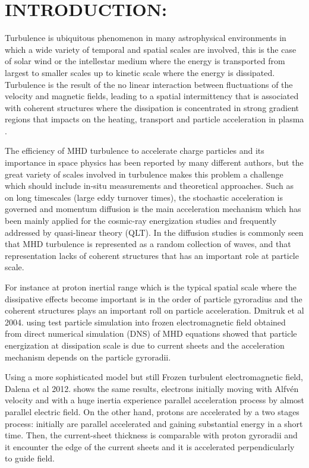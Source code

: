 \documentclass[%
aip,pop,amsmath,amssymb,
 reprint,%
]{revtex4-1}
\begin{document}
\section{\label{sec:level1}INTRODUCTION:}
Turbulence is ubiquitous phenomenon in many astrophysical environments in which a wide  
variety of temporal and spatial scales are involved, this is the case of solar wind or the 
intellestar medium where the energy is transported from largest to smaller scales up to 
kinetic scale where the energy is dissipated. Turbulence is the result of the  no linear 
interaction between fluctuations of the velocity and magnetic fields, leading to a 
spatial intermittency that is associated with coherent structures where the dissipation is 
concentrated in strong gradient regions that impacts on the heating, transport and particle 
acceleration in plasma \cite{M1}.

The efficiency of MHD turbulence to accelerate charge particles and its importance in space 
physics has been reported by many different authors\cite{F1,L1,M2}, but the great variety of 
scales involved in turbulence makes this problem a challenge which should include in-situ 
measurements and theoretical approaches. Such as on long timescales (large eddy turnover times),
the stochastic acceleration is governed and momentum diffusion is the main acceleration 
mechanism which has been mainly applied for the cosmic-ray energization studies and frequently
addressed by quasi-linear theory (QLT)\cite{S1,CH1,Lange1}. In the diffusion studies is 
commonly seen that MHD turbulence is represented as a random collection of waves, and that 
representation lacks of coherent structures that has an important role at particle scale.

For instance at proton inertial range which is the typical spatial scale where the 
dissipative effects become important is in the order of particle gyroradius and the coherent 
structures plays an important roll on particle acceleration. Dmitruk et al 2004.\cite{PD1}  
using test particle simulation into frozen electromagnetic field obtained from direct 
numerical simulation (DNS) of MHD equations showed that particle energization at dissipation
scale is due to current sheets and the acceleration mechanism depends on the particle 
gyroradii. 

Using a more sophisticated model but still Frozen turbulent electromagnetic field, Dalena et 
al 2012.\cite{Dalena2012} shows the same results, electrons initially moving with 
Alfv\'en velocity and with a huge inertia experience parallel acceleration process by almost 
parallel electric field. On the other hand, protons are accelerated by a two stages process: 
initially are parallel accelerated and gaining substantial energy in a short time. Then, the 
current-sheet thickness is comparable with proton gyroradii and it encounter the edge of the
current sheets and it is accelerated perpendicularly to guide field.  
\end{document}
